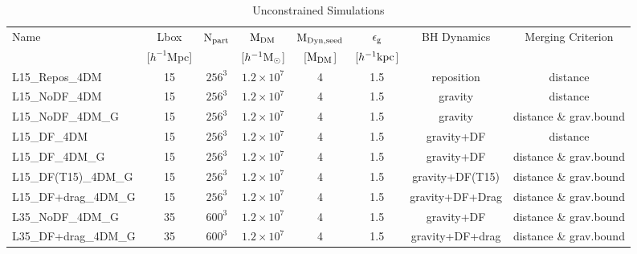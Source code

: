 \begin{table*}
\caption{Unconstrained Simulations}
\label{tab:norm}
\begin{tabular}{lccccccc}
\hline
Name & Lbox & ${\rm N}_{\rm part}$ & ${\rm M}_{\rm DM}$ & ${\rm M}_{\rm Dyn,seed}$ & $\epsilon_{\rm g}$ & BH Dynamics & Merging Criterion \\
& [$h^{-1}$Mpc] & & [$h^{-1} {\rm M}_\odot$] & [${\rm M}_{\rm DM}$] & [$h^{-1}{\rm kpc}$] & &  \\
\hline
L15\_Repos\_4DM & 15 & $256^3$ & $1.2\times 10^7$ & 4 & 1.5 & reposition & distance\\
L15\_NoDF\_4DM & 15 & $256^3$ & $1.2\times 10^7$ & 4 & 1.5 & gravity & distance\\
L15\_NoDF\_4DM\_G & 15 & $256^3$ & $1.2\times 10^7$ & 4 & 1.5 & gravity & distance \& grav.bound\\
L15\_DF\_4DM & 15 & $256^3$ & $1.2\times 10^7$ & 4 & 1.5 & gravity+DF & distance\\
L15\_DF\_4DM\_G & 15 & $256^3$ & $1.2\times 10^7$ & 4 & 1.5 & gravity+DF & distance \& grav.bound\\
L15\_DF(T15)\_4DM\_G & 15 & $256^3$ & $1.2\times 10^7$ & 4 & 1.5 & gravity+DF(T15) & distance \& grav.bound\\
L15\_DF+drag\_4DM\_G & 15 & $256^3$ & $1.2\times 10^7$ & 4 & 1.5 & gravity+DF+Drag & distance \& grav.bound\\
L35\_NoDF\_4DM\_G & 35 & $600^3$ & $1.2\times 10^7$ & 4 & 1.5 & gravity+DF & distance \& grav.bound\\
L35\_DF+drag\_4DM\_G & 35 & $600^3$ & $1.2\times 10^7$ & 4 & 1.5 & gravity+DF+drag & distance \& grav.bound\\

\hline
\end{tabular}
\end{table*}